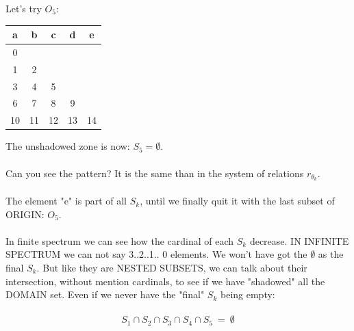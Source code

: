 		\noindent
		Let's try $O_{5}$:\\
		\begin{table}[h!]
			\begin{center}
				\begin{tabular}{|c|c|c|c|c|}
					\hline
					\cellcolor{myblue} a & 
					\cellcolor{myblue} b &
					\cellcolor{myblue} c &
					\cellcolor{myblue} d &
					\cellcolor{myblue} e \\
					\hline
					\cellcolor{applegreen!50} 0 &
					\multicolumn{4}{|c|}{} \\
					\hline
					\cellcolor{applegreen!50} 1 &
					\cellcolor{applegreen!50} 2 &
					\multicolumn{3}{|c|}{} \\
					\hline
					\cellcolor{applegreen!50} 3 &
					\cellcolor{applegreen!50} 4 &
					\cellcolor{applegreen!50} 5 &
					\multicolumn{2}{|c|}{} \\
					\hline
					\cellcolor{applegreen!50} 6 &
					\cellcolor{applegreen!50} 7 &
					\cellcolor{applegreen!50} 8 &
					\cellcolor{applegreen!50} 9 &
					\:\: \\
					\hline
					\cellcolor{applegreen!50} 10 &
					\cellcolor{applegreen!50} 11 &
					\cellcolor{applegreen!50} 12 &
					\cellcolor{applegreen!50} 13 &
					\cellcolor{applegreen!50} 14 \\
					\hline
				\end{tabular}
			\end{center}
		\end{table}
		
		\noindent
		The unshadowed zone is now: $S_{5} = \emptyset$.
		\\\\
		
		\newpage
		\noindent
		Can you see the pattern? It is the same than in the system of relations $r_{\theta_{k}}$.
		\\\\
		
		\noindent
		The element "e" is part of all $S_{k}$, until we finally quit it with the last subset of ORIGIN: $O_{5}$.
		\\\\
		
		\noindent
		In finite spectrum we can see how the cardinal of each $S_{k}$ decrease. IN INFINITE SPECTRUM we can not say 3..2..1.. 0 elements. We won't have got the $\emptyset$ as the final $S_{k}$. But like they are NESTED SUBSETS, we can talk about their intersection, without mention cardinals, to see if we have "shadowed" all the DOMAIN set. Even if we never have the "final" $S_{k}$ being empty:\\\\
		$$ S_{1} \cap S_{2} \cap S_{3} \cap S_{4} \cap S_{5} \: = \: \emptyset $$
		\\\\
		
